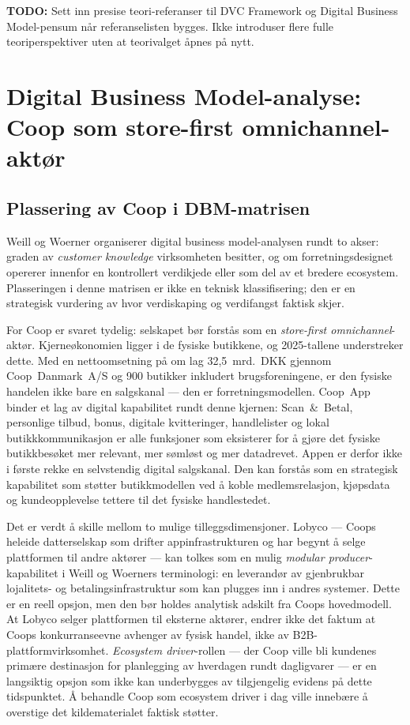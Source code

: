 \documentclass[12pt,a4paper]{article}
\newcommand{\todo}[1]{\par\noindent\textcolor{red!70!black}{\textbf{TODO:} #1}\par}
\begin{document}
\todo{Sett inn presise teori-referanser til DVC Framework og Digital Business Model-pensum når referanselisten bygges. Ikke introduser flere fulle teoriperspektiver uten at teorivalget åpnes på nytt.}

\section{Digital Business Model-analyse: Coop som store-first omnichannel-aktør}

\subsection{Plassering av Coop i DBM-matrisen}

Weill og Woerner organiserer digital business model-analysen rundt to akser: graden av \textit{customer knowledge} virksomheten besitter, og om forretningsdesignet opererer innenfor en kontrollert verdikjede eller som del av et bredere ecosystem. Plasseringen i denne matrisen er ikke en teknisk klassifisering; den er en strategisk vurdering av hvor verdiskaping og verdifangst faktisk skjer.

For Coop er svaret tydelig: selskapet bør forstås som en \textit{store-first omnichannel}-aktør. Kjerneøkonomien ligger i de fysiske butikkene, og 2025-tallene understreker dette. Med en nettoomsetning på om lag 32,5~mrd.~DKK gjennom Coop~Danmark~A/S og 900 butikker inkludert brugsforeningene, er den fysiske handelen ikke bare en salgskanal --- den er forretningsmodellen. Coop~App binder et lag av digital kapabilitet rundt denne kjernen: Scan~\&~Betal, personlige tilbud, bonus, digitale kvitteringer, handlelister og lokal butikkkommunikasjon er alle funksjoner som eksisterer for å gjøre det fysiske butikkbesøket mer relevant, mer sømløst og mer datadrevet. Appen er derfor ikke i første rekke en selvstendig digital salgskanal. Den kan forstås som en strategisk kapabilitet som støtter butikkmodellen ved å koble medlemsrelasjon, kjøpsdata og kundeopplevelse tettere til det fysiske handlestedet.

Det er verdt å skille mellom to mulige tilleggsdimensjoner. Lobyco --- Coops heleide datterselskap som drifter appinfrastrukturen og har begynt å selge plattformen til andre aktører --- kan tolkes som en mulig \textit{modular producer}-kapabilitet i Weill og Woerners terminologi: en leverandør av gjenbrukbar lojalitets- og betalingsinfrastruktur som kan plugges inn i andres systemer. Dette er en reell opsjon, men den bør holdes analytisk adskilt fra Coops hovedmodell. At Lobyco selger plattformen til eksterne aktører, endrer ikke det faktum at Coops konkurranseevne avhenger av fysisk handel, ikke av B2B-plattformvirksomhet. \textit{Ecosystem driver}-rollen --- der Coop ville bli kundenes primære destinasjon for planlegging av hverdagen rundt dagligvarer --- er en langsiktig opsjon som ikke kan underbygges av tilgjengelig evidens på dette tidspunktet. Å behandle Coop som ecosystem driver i dag ville innebære å overstige det kildematerialet faktisk støtter.
\end{document}
